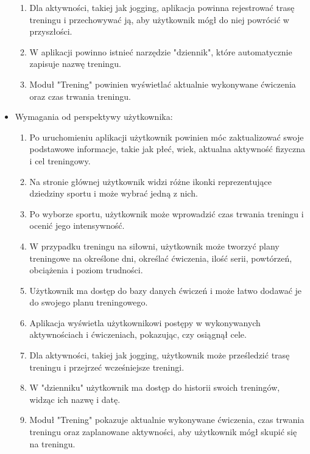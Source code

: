 \begin{itemize}
\begin{enumerate}
       \item Dla aktywności, takiej jak jogging, aplikacja powinna rejestrować trasę treningu i przechowywać ją, aby użytkownik mógł do niej powrócić w przyszłości.

       \item W aplikacji powinno istnieć narzędzie "dziennik", które automatycznie zapisuje nazwę treningu.

       \item Moduł "Trening" powinien wyświetlać aktualnie wykonywane ćwiczenia oraz czas trwania treningu.

    \end{enumerate}
    \newpage
    \item Wymagania od perspektywy użytkownika:
    \begin{enumerate}
        \item Po uruchomieniu aplikacji użytkownik powinien móc zaktualizować swoje podstawowe informacje, takie jak płeć, wiek, aktualna aktywność fizyczna i cel treningowy.

        \item Na stronie głównej użytkownik widzi różne ikonki reprezentujące dziedziny sportu i może wybrać jedną z nich.

        \item Po wyborze sportu, użytkownik może wprowadzić czas trwania treningu i ocenić jego intensywność.

        \item W przypadku treningu na siłowni, użytkownik może tworzyć plany treningowe na określone dni, określać ćwiczenia, ilość serii, powtórzeń, obciążenia i poziom trudności.

        \item Użytkownik ma dostęp do bazy danych ćwiczeń i może łatwo dodawać je do swojego planu treningowego.

        \item Aplikacja wyświetla użytkownikowi postępy w wykonywanych aktywnościach i ćwiczeniach, pokazując, czy osiągnął cele.

        \item Dla aktywności, takiej jak jogging, użytkownik może prześledzić trasę treningu i przejrzeć wcześniejsze treningi.

        \item W "dzienniku" użytkownik ma dostęp do historii swoich treningów, widząc ich nazwę i datę.

        \item Moduł "Trening" pokazuje aktualnie wykonywane ćwiczenia, czas trwania treningu oraz zaplanowane aktywności, aby użytkownik mógł skupić się na treningu.
    \end{enumerate}
\end{itemize}
 
